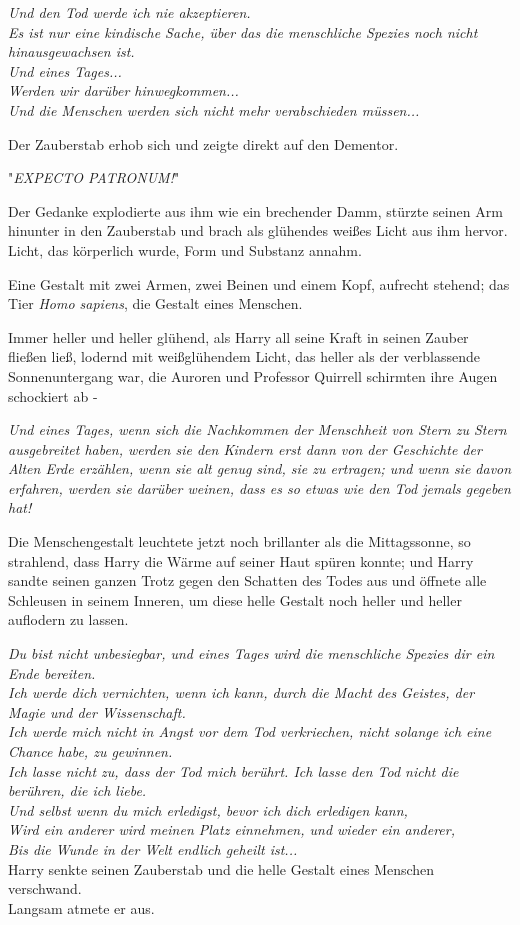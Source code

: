 {\emph{Und den Tod werde ich nie akzeptieren.}\\ \emph{Es ist nur eine kindische Sache, über das die menschliche Spezies noch nicht hinausgewachsen ist.}\\ \emph{Und eines Tages...}\\ \emph{Werden wir darüber hinwegkommen...}\\ \emph{Und die Menschen werden sich nicht mehr verabschieden müssen...}

Der Zauberstab erhob sich und zeigte direkt auf den Dementor.

"\emph{EXPECTO PATRONUM!}"

Der Gedanke explodierte aus ihm wie ein brechender Damm, stürzte seinen Arm hinunter in den Zauberstab und brach als glühendes weißes Licht aus ihm hervor. Licht, das körperlich wurde, Form und Substanz annahm.

Eine Gestalt mit zwei Armen, zwei Beinen und einem Kopf, aufrecht stehend; das Tier \emph{Homo sapiens}, die Gestalt eines Menschen.

Immer heller und heller glühend, als Harry all seine Kraft in seinen Zauber fließen ließ, lodernd mit weißglühendem Licht, das heller als der verblassende Sonnenuntergang war, die Auroren und Professor Quirrell schirmten ihre Augen schockiert ab -

\emph{Und eines Tages, wenn sich die Nachkommen der Menschheit von Stern zu Stern ausgebreitet haben, werden sie den Kindern erst dann von der Geschichte der Alten Erde erzählen, wenn sie alt genug sind, sie zu ertragen; und wenn sie davon erfahren, werden sie darüber weinen, dass es so etwas wie den Tod jemals gegeben hat!}

Die Menschengestalt leuchtete jetzt noch brillanter als die Mittagssonne, so strahlend, dass Harry die Wärme auf seiner Haut spüren konnte; und Harry sandte seinen ganzen Trotz gegen den Schatten des Todes aus und öffnete alle Schleusen in seinem Inneren, um diese helle Gestalt noch heller und heller auflodern zu lassen.

\emph{Du bist nicht unbesiegbar, und eines Tages wird die menschliche Spezies dir ein Ende bereiten.}\\ \emph{Ich werde dich vernichten, wenn ich kann, durch die Macht des Geistes, der Magie und der Wissenschaft.}\\ \emph{Ich werde mich nicht in Angst vor dem Tod verkriechen, nicht solange ich eine Chance habe, zu gewinnen.}\\ \emph{Ich lasse nicht zu, dass der Tod mich berührt. Ich lasse den Tod nicht die berühren, die ich liebe.}\\ \emph{Und selbst wenn du mich erledigst, bevor ich dich erledigen kann,}\\ \emph{Wird ein anderer wird meinen Platz einnehmen, und wieder ein anderer,}\\ \emph{Bis die Wunde in der Welt endlich geheilt ist...}\\ Harry senkte seinen Zauberstab und die helle Gestalt eines Menschen verschwand.\\ Langsam atmete er aus.

}
